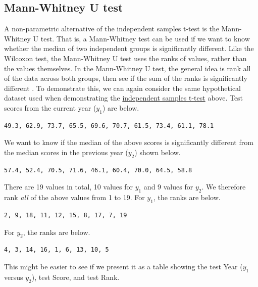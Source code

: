 \documentclass[
]{scrbook}
\begin{document}
\hypertarget{mann-whitney-u-test}{%
\subsection{Mann-Whitney U test}\label{mann-whitney-u-test}}

A non-parametric alternative of the independent samples t-test is the Mann-Whitney U test.
That is, a Mann-Whitney test can be used if we want to know whether the median of two independent groups is significantly different.
Like the Wilcoxon test, the Mann-Whitney U test uses the ranks of values, rather than the values themselves.
In the Mann-Whitney U test, the general idea is rank all of the data across both groups, then see if the sum of the ranks is significantly different \citep{Sokal1995}.
To demonstrate this, we can again consider the same hypothetical dataset used when demonstrating the \protect\hyperlink{independent-samples-t-test}{independent samples t-test} above.
Test scores from the current year (\(y_{1}\)) are below.

\begin{verbatim}
49.3, 62.9, 73.7, 65.5, 69.6, 70.7, 61.5, 73.4, 61.1, 78.1
\end{verbatim}

We want to know if the median of the above scores is significantly different from the median scores in the previous year (\(y_{2}\)) shown below.

\begin{verbatim}
57.4, 52.4, 70.5, 71.6, 46.1, 60.4, 70.0, 64.5, 58.8
\end{verbatim}

There are 19 values in total, 10 values for \(y_{1}\) and 9 values for \(y_{2}\).
We therefore rank \emph{all} of the above values from 1 to 19.
For \(y_{1}\), the ranks are below.

\begin{verbatim}
2, 9, 18, 11, 12, 15, 8, 17, 7, 19
\end{verbatim}

For \(y_{2}\), the ranks are below.

\begin{verbatim}
4, 3, 14, 16, 1, 6, 13, 10, 5
\end{verbatim}

This might be easier to see if we present it as a table showing the test Year (\(y_{1}\) versus \(y_{2}\)), test Score, and test Rank.
\end{document}
